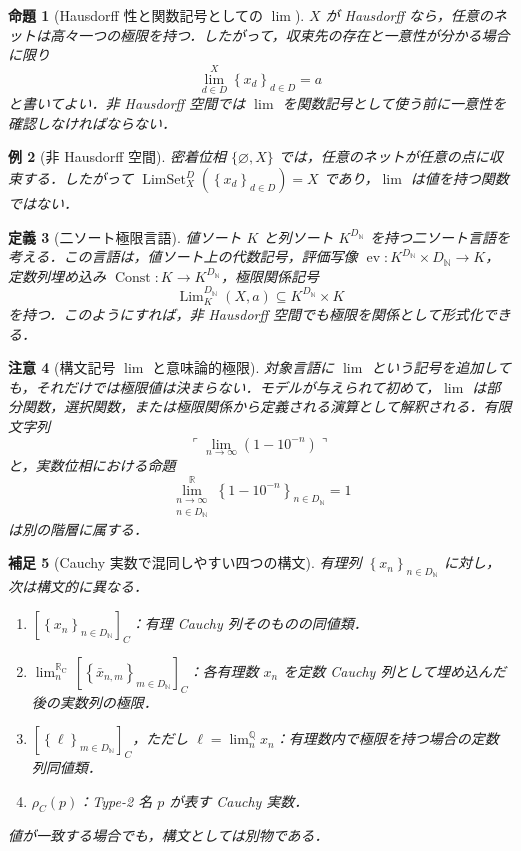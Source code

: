 \documentclass[a4paper,11pt]{ltjsarticle}
\theoremstyle{jpdef}
\newtheorem{definition}{定義}[section]
\newtheorem{remark}[definition]{補足}
\newtheorem{warning}[definition]{注意}
\newtheorem{example}[definition]{例}
\theoremstyle{jpthm}
\newtheorem{proposition}[definition]{命題}
\newcommand{\N}{\mathbb{N}}
\newcommand{\Q}{\mathbb{Q}}
\newcommand{\R}{\mathbb{R}}
\newcommand{\Const}{\operatorname{Const}}
\newcommand{\Lim}{\operatorname{Lim}}
\newcommand{\LimSet}{\operatorname{LimSet}}
\newcommand{\DN}{D_{\N}}
\newcommand{\seq}[2]{\left\{#1\right\}_{#2}}
\newcommand{\RealC}{\mathbb{R}_{\mathrm C}}
\begin{document}
\begin{proposition}[Hausdorff 性と関数記号としての \(\lim\)]
\(X\) が Hausdorff なら，任意のネットは高々一つの極限を持つ．したがって，収束先の存在と一意性が分かる場合に限り
\[
  \lim_{d\in D}^X \seq{x_d}{d\in D}=a
\]
と書いてよい．非 Hausdorff 空間では \(\lim\) を関数記号として使う前に一意性を確認しなければならない．
\end{proposition}

\begin{example}[非 Hausdorff 空間]
密着位相 \(\{\varnothing,X\}\) では，任意のネットが任意の点に収束する．したがって \(\LimSet_X^D(\seq{x_d}{d\in D})=X\) であり，\(\lim\) は値を持つ関数ではない．
\end{example}

\begin{definition}[二ソート極限言語]
値ソート \(K\) と列ソート \(K^{\DN}\) を持つ二ソート言語を考える．この言語は，値ソート上の代数記号，評価写像 \(\operatorname{ev}:K^{\DN}\times\DN\to K\)，定数列埋め込み \(\Const:K\to K^{\DN}\)，極限関係記号
\[
  \Lim_K^{\DN}(X,a)\subseteq K^{\DN}\times K
\]
を持つ．このようにすれば，非 Hausdorff 空間でも極限を関係として形式化できる．
\end{definition}

\begin{warning}[構文記号 \(\lim\) と意味論的極限]
対象言語に \(\lim\) という記号を追加しても，それだけでは極限値は決まらない．モデルが与えられて初めて，\(\lim\) は部分関数，選択関数，または極限関係から定義される演算として解釈される．有限文字列
\[
  \ulcorner\lim_{n\to\infty}(1-10^{-n})\urcorner
\]
と，実数位相における命題
\[
  \lim_{\substack{n\to\infty\\ n\in\DN}}^{\R}\seq{1-10^{-n}}{n\in\DN}=1
\]
は別の階層に属する．
\end{warning}

\begin{remark}[Cauchy 実数で混同しやすい四つの構文]
有理列 \(\seq{x_n}{n\in\DN}\) に対し，次は構文的に異なる．
\begin{enumerate}
\item \([\seq{x_n}{n\in\DN}]_C\)：有理 Cauchy 列そのものの同値類．
\item \(\lim_n^{\RealC}\,[\seq{\bar x_{n,m}}{m\in\DN}]_C\)：各有理数 \(x_n\) を定数 Cauchy 列として埋め込んだ後の実数列の極限．
\item \([\seq{\ell}{m\in\DN}]_C\)，ただし \(\ell=\lim_n^\Q x_n\)：有理数内で極限を持つ場合の定数列同値類．
\item \(\rho_C(p)\)：Type-2 名 \(p\) が表す Cauchy 実数．
\end{enumerate}
値が一致する場合でも，構文としては別物である．
\end{remark}
\end{document}

